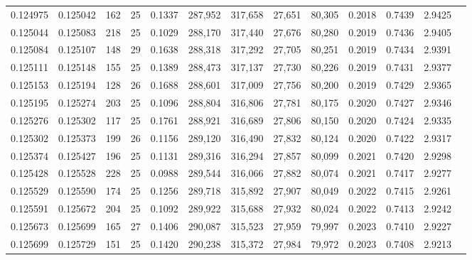 \begin{tabular}{rrrrrrrrrrrrr}
0.124975 & 0.125042 & 162 &  25 &                                     0.1337 & 287,952 & 317,658 &  27,651 &  80,305 & 0.2018 & 0.7439 & 2.9425 \\
0.125044 & 0.125083 & 218 &  25 &                                     0.1029 & 288,170 & 317,440 &  27,676 &  80,280 & 0.2019 & 0.7436 & 2.9405 \\
0.125084 & 0.125107 & 148 &  29 &                                     0.1638 & 288,318 & 317,292 &  27,705 &  80,251 & 0.2019 & 0.7434 & 2.9391 \\
0.125111 & 0.125148 & 155 &  25 &                                     0.1389 & 288,473 & 317,137 &  27,730 &  80,226 & 0.2019 & 0.7431 & 2.9377 \\
0.125153 & 0.125194 & 128 &  26 &                                     0.1688 & 288,601 & 317,009 &  27,756 &  80,200 & 0.2019 & 0.7429 & 2.9365 \\
0.125195 & 0.125274 & 203 &  25 &                                     0.1096 & 288,804 & 316,806 &  27,781 &  80,175 & 0.2020 & 0.7427 & 2.9346 \\
0.125276 & 0.125302 & 117 &  25 &                                     0.1761 & 288,921 & 316,689 &  27,806 &  80,150 & 0.2020 & 0.7424 & 2.9335 \\
0.125302 & 0.125373 & 199 &  26 &                                     0.1156 & 289,120 & 316,490 &  27,832 &  80,124 & 0.2020 & 0.7422 & 2.9317 \\
0.125374 & 0.125427 & 196 &  25 &                                     0.1131 & 289,316 & 316,294 &  27,857 &  80,099 & 0.2021 & 0.7420 & 2.9298 \\
0.125428 & 0.125528 & 228 &  25 &                                     0.0988 & 289,544 & 316,066 &  27,882 &  80,074 & 0.2021 & 0.7417 & 2.9277 \\
0.125529 & 0.125590 & 174 &  25 &                                     0.1256 & 289,718 & 315,892 &  27,907 &  80,049 & 0.2022 & 0.7415 & 2.9261 \\
0.125591 & 0.125672 & 204 &  25 &                                     0.1092 & 289,922 & 315,688 &  27,932 &  80,024 & 0.2022 & 0.7413 & 2.9242 \\
0.125673 & 0.125699 & 165 &  27 &                                     0.1406 & 290,087 & 315,523 &  27,959 &  79,997 & 0.2023 & 0.7410 & 2.9227 \\
0.125699 & 0.125729 & 151 &  25 &                                     0.1420 & 290,238 & 315,372 &  27,984 &  79,972 & 0.2023 & 0.7408 & 2.9213 \\

\end{tabular}
